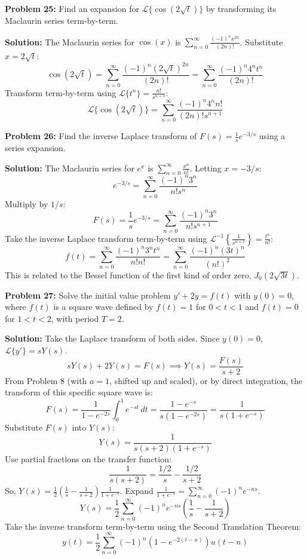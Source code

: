 \documentclass[11pt, letterpaper]{article}
\theoremstyle{definition}
\theoremstyle{remark}
\begin{document}
\vspace{1em}
\textbf{Problem 25:} Find an expansion for $\mathcal{L} \{\cos(2\sqrt{t})\}$ by transforming its Maclaurin series term-by-term.

\textbf{Solution:}
The Maclaurin series for $\cos(x)$ is $\sum_{n=0}^\infty \frac{(-1)^n x^{2n}}{(2n)!}$. Substitute $x = 2\sqrt{t}$:
\[ \cos(2\sqrt{t}) = \sum_{n=0}^\infty \frac{(-1)^n (2\sqrt{t})^{2n}}{(2n)!} = \sum_{n=0}^\infty \frac{(-1)^n 4^n t^n}{(2n)!} \]
Transform term-by-term using $\mathcal{L}\{t^n\} = \frac{n!}{s^{n+1}}$:
\[ \mathcal{L}\{\cos(2\sqrt{t})\} = \sum_{n=0}^\infty \frac{(-1)^n 4^n n!}{(2n)! s^{n+1}} \]

\vspace{1em}
\textbf{Problem 26:} Find the inverse Laplace transform of $F(s) = \frac{1}{s} e^{-3/s}$ using a series expansion.

\textbf{Solution:}
The Maclaurin series for $e^x$ is $\sum_{n=0}^\infty \frac{x^n}{n!}$. Letting $x = -3/s$:
\[ e^{-3/s} = \sum_{n=0}^\infty \frac{(-1)^n 3^n}{n! s^n} \]
Multiply by $1/s$:
\[ F(s) = \frac{1}{s} e^{-3/s} = \sum_{n=0}^\infty \frac{(-1)^n 3^n}{n! s^{n+1}} \]
Take the inverse Laplace transform term-by-term using $\mathcal{L}^{-1} \left\{ \frac{1}{s^{n+1}} \right\} = \frac{t^n}{n!}$:
\[ f(t) = \sum_{n=0}^\infty \frac{(-1)^n 3^n t^n}{n! n!} = \sum_{n=0}^\infty \frac{(-1)^n (3t)^n}{(n!)^2} \]
This is related to the Bessel function of the first kind of order zero, $J_0(2\sqrt{3t})$.

\vspace{1em}
\textbf{Problem 27:} Solve the initial value problem $y' + 2y = f(t)$ with $y(0) = 0$, where $f(t)$ is a square wave defined by $f(t) = 1$ for $0 < t < 1$ and $f(t) = 0$ for $1 < t < 2$, with period $T = 2$.

\textbf{Solution:}
Take the Laplace transform of both sides. Since $y(0) = 0$, $\mathcal{L}\{y'\} = sY(s)$.
\[ sY(s) + 2Y(s) = F(s) \implies Y(s) = \frac{F(s)}{s + 2} \]
From Problem 8 (with $a=1$, shifted up and scaled), or by direct integration, the transform of this specific square wave is:
\[ F(s) = \frac{1}{1 - e^{-2s}} \int_0^1 e^{-st} \,dt = \frac{1 - e^{-s}}{s(1 - e^{-2s})} = \frac{1}{s(1 + e^{-s})} \]
Substitute $F(s)$ into $Y(s)$:
\[ Y(s) = \frac{1}{s(s + 2)(1 + e^{-s})} \]
Use partial fractions on the transfer function:
\[ \frac{1}{s(s + 2)} = \frac{1/2}{s} - \frac{1/2}{s + 2} \]
So, $Y(s) = \frac{1}{2} \left( \frac{1}{s} - \frac{1}{s + 2} \right) \frac{1}{1 + e^{-s}}$.
Expand $\frac{1}{1 + e^{-s}} = \sum_{n=0}^\infty (-1)^n e^{-ns}$.
\[ Y(s) = \frac{1}{2} \sum_{n=0}^\infty (-1)^n e^{-ns} \left( \frac{1}{s} - \frac{1}{s + 2} \right) \]
Take the inverse transform term-by-term using the Second Translation Theorem:
\[ y(t) = \frac{1}{2} \sum_{n=0}^\infty (-1)^n \left( 1 - e^{-2(t - n)} \right) u(t - n) \]
\end{document}

